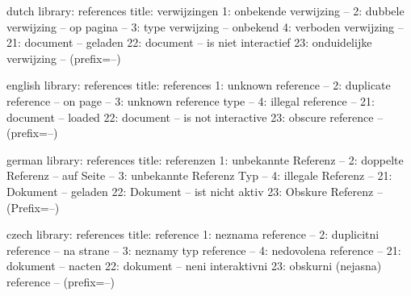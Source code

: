 

%

%
%

%
%


\unprotect

\startmessages  dutch  library: references
  title: verwijzingen
      1: onbekende verwijzing --
      2: dubbele verwijzing -- op pagina --
      3: type verwijzing -- onbekend
      4: verboden verwijzing --
     21: document -- geladen
     22: document -- is niet interactief
     23: onduidelijke verwijzing -- (prefix=--)
\stopmessages

\startmessages  english  library: references
  title: references
      1: unknown reference --
      2: duplicate reference -- on page --
      3: unknown reference type --
      4: illegal reference --
     21: document -- loaded
     22: document -- is not interactive
     23: obscure reference -- (prefix=--)
\stopmessages

\startmessages  german  library: references
  title: referenzen
      1: unbekannte Referenz --
      2: doppelte Referenz -- auf Seite --
      3: unbekannte Referenz Typ --
      4: illegale Referenz --
     21: Dokument -- geladen
     22: Dokument -- ist nicht aktiv
     23: Obskure Referenz -- (Prefix=--)
\stopmessages

\startmessages  czech  library: references
  title: reference
      1: neznama reference --
      2: duplicitni reference -- na strane --
      3: neznamy typ reference --
      4: nedovolena reference --
     21: dokument -- nacten
     22: dokument -- neni interaktivni
     23: obskurni (nejasna) reference -- (prefix=--)
\stopmessages

